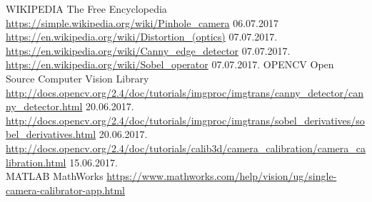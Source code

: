 \documentclass[journal,final,a4paper,twoside]{PS}
\begin{document}
\begin{thebibliography}{1}
WIKIPEDIA {The Free Encyclopedia}
\url{https://simple.wikipedia.org/wiki/Pinhole_camera} 06.07.2017\\
\url {https://en.wikipedia.org/wiki/Distortion_(optics)} 07.07.2017.\\
\url {https://en.wikipedia.org/wiki/Canny_edge_detector} 07.07.2017.\\
\url {https://en.wikipedia.org/wiki/Sobel_operator} 07.07.2017.
OPENCV {Open Source Computer Vision Library}
\url {http://docs.opencv.org/2.4/doc/tutorials/imgproc/imgtrans/canny_detector/canny_detector.html} 20.06.2017.\\
\url {http://docs.opencv.org/2.4/doc/tutorials/imgproc/imgtrans/sobel_derivatives/sobel_derivatives.html} 20.06.2017.\\
\url {http://docs.opencv.org/2.4/doc/tutorials/calib3d/camera_calibration/camera_calibration.html} 15.06.2017.\\
MATLAB {MathWorks}
\url {https://www.mathworks.com/help/vision/ug/single-camera-calibrator-app.html}
\end{thebibliography}
\end{document}
